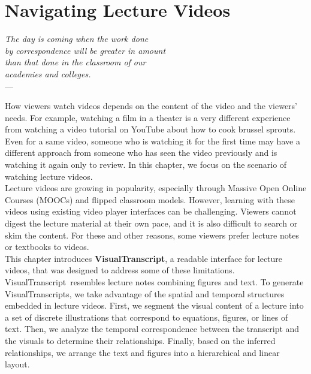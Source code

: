 \newcommand{\systemname}[0]{VisualTranscript}
\chapter{Navigating Lecture Videos} %
\label{ch:visualtranscript} %
%
\begin{flushright}{\slshape    
The day is coming when the work done\\
by correspondence will be greater in amount\\
than that done in the classroom of our\\
academies and colleges.} \\ \medskip
---  \citep{harper:1886}
\end{flushright}
How viewers watch videos depends on the content of the video and the viewers'
needs. For example, watching a film in a theater is a very different experience
from watching a video tutorial on YouTube about how to cook brussel sprouts.
Even for a same video, someone who is watching it for the first time may have a
different approach from someone who has seen the video previously and is
watching it again only to review. In this chapter, we focus on the scenario of
watching lecture videos. \\

Lecture videos are growing in popularity, especially through Massive Open Online Courses
(MOOCs) and flipped classroom models.
However, learning with these videos using existing video player interfaces can
be challenging. Viewers cannot digest the lecture material at their
own pace, and it is also difficult to search or skim the content. For these and other
reasons, some viewers prefer lecture notes or textbooks to videos.\\

This chapter introduces \textbf{\systemname}, a readable
interface for lecture videos, that was designed to address some of these limitations. \systemname\ resembles lecture notes combining figures and text. To generate \systemname s, we take advantage of the spatial and temporal structures embedded in lecture videos. First, we segment the visual content
of a lecture into a set of discrete illustrations that correspond to equations, figures, or lines of text. Then, we analyze
the temporal correspondence between the transcript and the visuals to determine their relationships. Finally, based on the inferred relationships, we arrange the text and figures into a hierarchical and linear layout. \\

